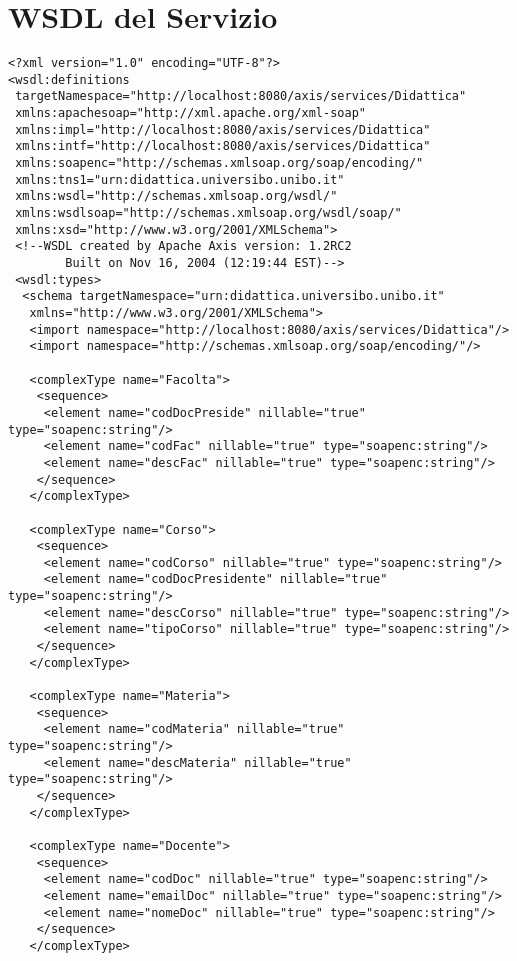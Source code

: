 \clearpage{\pagestyle{empty}\cleardoublepage}
\chapter{WSDL del Servizio} 

\begin{small}\begin{verbatim}
<?xml version="1.0" encoding="UTF-8"?>
<wsdl:definitions 
 targetNamespace="http://localhost:8080/axis/services/Didattica"
 xmlns:apachesoap="http://xml.apache.org/xml-soap"
 xmlns:impl="http://localhost:8080/axis/services/Didattica"
 xmlns:intf="http://localhost:8080/axis/services/Didattica"
 xmlns:soapenc="http://schemas.xmlsoap.org/soap/encoding/" 
 xmlns:tns1="urn:didattica.universibo.unibo.it" 
 xmlns:wsdl="http://schemas.xmlsoap.org/wsdl/" 
 xmlns:wsdlsoap="http://schemas.xmlsoap.org/wsdl/soap/" 
 xmlns:xsd="http://www.w3.org/2001/XMLSchema">
 <!--WSDL created by Apache Axis version: 1.2RC2
        Built on Nov 16, 2004 (12:19:44 EST)-->
 <wsdl:types>
  <schema targetNamespace="urn:didattica.universibo.unibo.it" 
   xmlns="http://www.w3.org/2001/XMLSchema">
   <import namespace="http://localhost:8080/axis/services/Didattica"/>
   <import namespace="http://schemas.xmlsoap.org/soap/encoding/"/>
   
   <complexType name="Facolta">
    <sequence>
     <element name="codDocPreside" nillable="true" type="soapenc:string"/>
     <element name="codFac" nillable="true" type="soapenc:string"/>
     <element name="descFac" nillable="true" type="soapenc:string"/>
    </sequence>
   </complexType>
   
   <complexType name="Corso">
    <sequence>
     <element name="codCorso" nillable="true" type="soapenc:string"/>
     <element name="codDocPresidente" nillable="true" type="soapenc:string"/>
     <element name="descCorso" nillable="true" type="soapenc:string"/>
     <element name="tipoCorso" nillable="true" type="soapenc:string"/>
    </sequence>
   </complexType>
   
   <complexType name="Materia">
    <sequence>
     <element name="codMateria" nillable="true" type="soapenc:string"/>
     <element name="descMateria" nillable="true" type="soapenc:string"/>
    </sequence>
   </complexType>

   <complexType name="Docente">
    <sequence>
     <element name="codDoc" nillable="true" type="soapenc:string"/>
     <element name="emailDoc" nillable="true" type="soapenc:string"/>
     <element name="nomeDoc" nillable="true" type="soapenc:string"/>
    </sequence>
   </complexType>
   

\end{verbatim}
\end{small}
